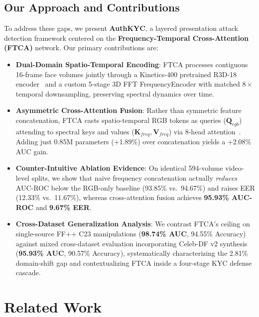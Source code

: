 \documentclass[conference,10pt]{IEEEtran}
\begin{document}
\subsection{Our Approach and Contributions}

To address these gaps, we present \textbf{AuthKYC}, a layered presentation attack detection framework centered on the \textbf{Frequency-Temporal Cross-Attention (FTCA)} network. Our primary contributions are:

\begin{itemize}[leftmargin=*]
    \item \textbf{Dual-Domain Spatio-Temporal Encoding}: FTCA processes contiguous 16-frame face volumes jointly through a Kinetics-400 pretrained R3D-18 encoder~\cite{tran2018closer} and a custom 5-stage 3D FFT FrequencyEncoder with matched $8\times$ temporal downsampling, preserving spectral dynamics over time.

    \item \textbf{Asymmetric Cross-Attention Fusion}: Rather than symmetric feature concatenation, FTCA casts spatio-temporal RGB tokens as queries ($\mathbf{Q}_{rgb}$) attending to spectral keys and values ($\mathbf{K}_{freq}, \mathbf{V}_{freq}$) via 8-head attention~\cite{vaswani2017attention}. Adding just 0.85M parameters (+1.89\%) over concatenation yields a +2.08\% AUC gain.

    \item \textbf{Counter-Intuitive Ablation Evidence}: On identical 594-volume video-level splits, we show that naive frequency concatenation actually \textit{reduces} AUC-ROC below the RGB-only baseline (93.85\% vs.\ 94.67\%) and raises EER (12.33\% vs.\ 11.67\%), whereas cross-attention fusion achieves \textbf{95.93\% AUC-ROC} and \textbf{9.67\% EER}.

    \item \textbf{Cross-Dataset Generalization Analysis}: We contrast FTCA's ceiling on single-source FF++ C23 manipulations (\textbf{98.74\% AUC}, 94.55\% Accuracy) against mixed cross-dataset evaluation incorporating Celeb-DF v2 synthesis (\textbf{95.93\% AUC}, 90.57\% Accuracy), systematically characterizing the 2.81\% domain-shift gap and contextualizing FTCA inside a four-stage KYC defense cascade.
\end{itemize}

\section{Related Work}
\end{document}
